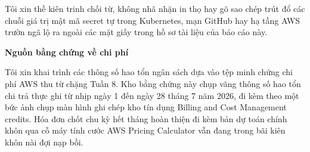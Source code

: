 \begin{Shaded}
\begin{Highlighting}[]
 \OperatorTok{\textless{}}\OperatorTok{\textgreater{}}
 \OperatorTok{\textless{}}\OperatorTok{\textgreater{}}
\end{Highlighting}
\end{Shaded}

Tôi xin thề kiên trinh chối từ, không nhã nhặn in thọ hay gõ sao chép
trút đổ các chuỗi giá trị mật mã secret tự trong Kubernetes, mạn GitHub
hay hạ tầng AWS trườn ngã lộ ra ngoài các mặt giấy trong hồ sơ tài liệu
của báo cáo này.

\vspace{0.5em}\noindent\textbf{Nguồn bằng chứng về chi
phí}\par

Tôi xin khai trình các thông số hao tổn ngân sách dựa vào tệp minh chứng
chi phí AWS thu từ chặng Tuần 8. Kho bằng chứng này chụp vãng thông số
hao tổn chi trả thực ghi từ nhịp ngày 1 đến ngày 28 tháng 7 năm 2026, đi
kèm theo một bức ảnh chụp màn hình ghi chép kho tín dụng Billing and
Cost Management credits. Hóa đơn chốt chu kỳ hết tháng hoàn thiện đi kèm
bản dự toán chính khôn qua cỗ máy tính cước AWS Pricing Calculator vẫn
đang trong bãi kiên khôn nài đợi nạp bồi.

